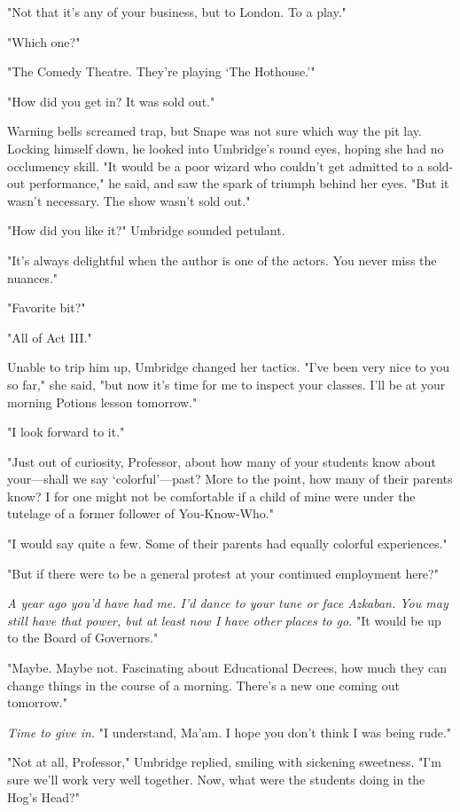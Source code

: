 "Not that it's any of your business, but to London. To a play."

"Which one?"

"The Comedy Theatre. They're playing `The Hothouse.'"

"How did you get in? It was sold out."

Warning bells screamed trap, but Snape was not sure which way the pit lay. Locking himself down, he looked into Umbridge's round eyes, hoping she had no occlumency skill. "It would be a poor wizard who couldn't get admitted to a sold-out performance," he said, and saw the spark of triumph behind her eyes. "But it wasn't necessary. The show wasn't sold out."

"How did you like it?" Umbridge sounded petulant.

"It's always delightful when the author is one of the actors. You never miss the nuances."

"Favorite bit?"

"All of Act III."

Unable to trip him up, Umbridge changed her tactics. "I've been very nice to you so far," she said, "but now it's time for me to inspect your classes. I'll be at your morning Potions lesson tomorrow."

"I look forward to it."

"Just out of curiosity, Professor, about how many of your students know about your—shall we say `colorful'—past? More to the point, how many of their parents know? I for one might not be comfortable if a child of mine were under the tutelage of a former follower of You-Know-Who."

"I would say quite a few. Some of their parents had equally colorful experiences."

"But if there were to be a general protest at your continued employment here?"

\emph{A year ago you'd have had me. I'd dance to your tune or face Azkaban. You may still have that power, but at least now I have other places to go.} "It would be up to the Board of Governors."

"Maybe. Maybe not. Fascinating about Educational Decrees, how much they can change things in the course of a morning. There's a new one coming out tomorrow."

\emph{Time to give in.} "I understand, Ma'am. I hope you don't think I was being rude."

"Not at all, Professor," Umbridge replied, smiling with sickening sweetness. "I'm sure we'll work very well together. Now, what were the students doing in the Hog's Head?"

